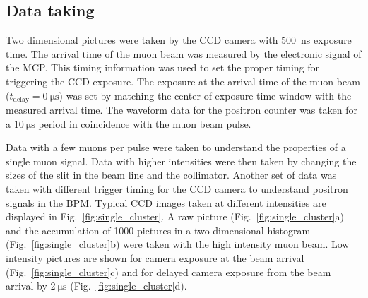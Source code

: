 \documentclass[preprint,3p,twocolumn]{elsarticle}
\begin{document}
\subsection{Data taking} 

Two dimensional pictures were taken by the CCD camera with
\SI{500}{\nano\s} exposure time.  The arrival time of the muon
beam was measured by the electronic signal of the MCP. This timing
information was used to set the proper timing for triggering the
CCD exposure. The exposure at the arrival time of the muon beam ($t_{\text{delay}} = \SI{0}{\micro\s}$) was set by matching the center of exposure time window with the measured arrival time.
The waveform data for the positron counter was
taken for a $\SI{10}{\micro\s}$ period in coincidence with the
muon beam pulse.

Data with a few muons per pulse were taken to understand the
properties of a single muon signal.  Data with higher
intensities were then taken by changing the sizes of the slit in
the beam line and the collimator.  Another set of data was
taken with different trigger timing for the CCD camera to understand
positron signals in the BPM.  Typical CCD images taken at
different intensities are displayed in
Fig.~\ref{fig:single_cluster}. A raw picture (Fig.~\ref{fig:single_cluster}a) and
the accumulation of 1000 pictures in a two dimensional histogram (Fig.~\ref{fig:single_cluster}b) were taken
with the high intensity muon beam. Low intensity pictures are
shown for camera exposure at the beam arrival (Fig.~\ref{fig:single_cluster}c) and for delayed camera exposure from the beam arrival
by $\SI{2}{\micro\s}$ (Fig.~\ref{fig:single_cluster}d).
\end{document}
